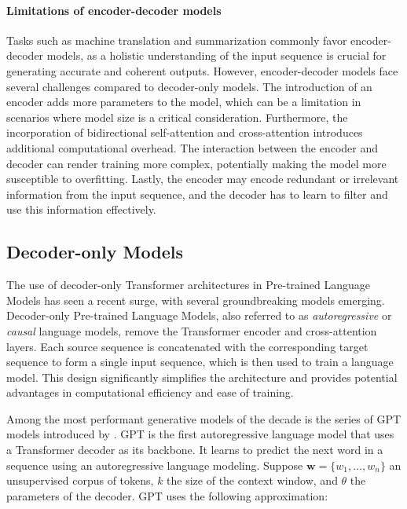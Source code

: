 \paragraph{Limitations of encoder-decoder models} Tasks such as machine translation and summarization commonly favor encoder-decoder models, as  a holistic understanding of the input sequence is crucial for generating accurate and coherent outputs. However, encoder-decoder models face several challenges compared to decoder-only models. The introduction of an encoder adds more parameters to the model, which can be a limitation in scenarios where model size is a critical consideration. Furthermore, the incorporation of bidirectional self-attention and cross-attention introduces additional computational overhead. The interaction between the encoder and decoder can render training more complex, potentially making the model more susceptible to overfitting. Lastly, the encoder may encode redundant or irrelevant information from the input sequence, and the decoder has to learn to filter and use this information effectively.

\subsection{Decoder-only Models}


The use of decoder-only Transformer architectures in Pre-trained Language Models has seen a recent surge, with several groundbreaking models \citep{radford2018improving, brown2020language, ouyang2022training, touvron2023llama} emerging. Decoder-only Pre-trained Language Models, also referred to as \textit{autoregressive} or \textit{causal} language models, remove the Transformer encoder and cross-attention layers. Each source sequence is concatenated with the corresponding target sequence to form a single input sequence, which is then used to train a language model. This design significantly simplifies the architecture and provides potential advantages in computational efficiency and ease of training. 

Among the most performant generative models of the decade is the series of \ac{GPT} models introduced by \citep{radford2018improving}. \ac{GPT} is the first autoregressive language model that uses a Transformer decoder as its backbone. It learns to predict the next word in a sequence using an autoregressive language modeling. Suppose $\bm{w} = \{w_1, \ldots, w_n\}$ an unsupervised corpus of tokens, $k$ the size of the context window, and $\theta$ the parameters of the decoder. 
\ac{GPT} uses the following approximation:

